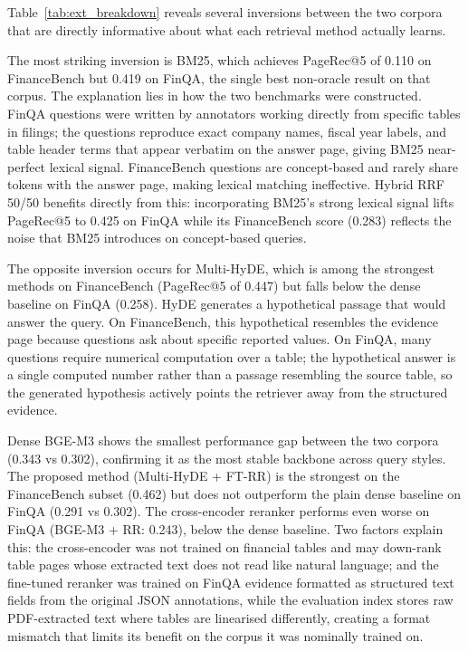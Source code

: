 \documentclass[12pt,twoside,maitrise]{dms}
\theoremstyle{definition}
\numberwithin{equation}{section}
\numberwithin{table}{chapter}
\numberwithin{figure}{chapter}
\begin{document}
Table~\ref{tab:ext_breakdown} reveals several inversions between the two corpora that
are directly informative about what each retrieval method actually learns.

The most striking inversion is BM25, which achieves PageRec@5 of 0.110 on
FinanceBench but 0.419 on FinQA, the single best non-oracle result on that corpus.
The explanation lies in how the two benchmarks were constructed. FinQA questions were
written by annotators working directly from specific tables in filings; the questions
reproduce exact company names, fiscal year labels, and table header terms that appear
verbatim on the answer page, giving BM25 near-perfect lexical signal. FinanceBench
questions are concept-based and rarely share tokens with the answer page, making lexical
matching ineffective. Hybrid RRF 50/50 benefits directly from this: incorporating
BM25's strong lexical signal lifts PageRec@5 to 0.425 on FinQA while its
FinanceBench score (0.283) reflects the noise that BM25 introduces on concept-based
queries.

The opposite inversion occurs for Multi-HyDE, which is among the strongest methods on
FinanceBench (PageRec@5 of 0.447) but falls below the dense baseline on FinQA (0.258).
HyDE generates a hypothetical passage that would answer the query. On FinanceBench,
this hypothetical resembles the evidence page because questions ask about specific
reported values. On FinQA, many questions require numerical computation over a table;
the hypothetical answer is a single computed number rather than a passage resembling the
source table, so the generated hypothesis actively points the retriever away from the
structured evidence.

Dense BGE-M3 shows the smallest performance gap between the two corpora (0.343 vs
0.302), confirming it as the most stable backbone across query styles. The proposed
method (Multi-HyDE + FT-RR) is the strongest on the FinanceBench subset (0.462) but
does not outperform the plain dense baseline on FinQA (0.291 vs 0.302). The
cross-encoder reranker performs even worse on FinQA (BGE-M3 + RR: 0.243), below the
dense baseline. Two factors explain this: the cross-encoder was not trained on financial
tables and may down-rank table pages whose extracted text does not read like natural
language; and the fine-tuned reranker was trained on FinQA evidence formatted as
structured text fields from the original JSON annotations, while the evaluation index
stores raw PDF-extracted text where tables are linearised differently, creating a format
mismatch that limits its benefit on the corpus it was nominally trained on.
\end{document}
